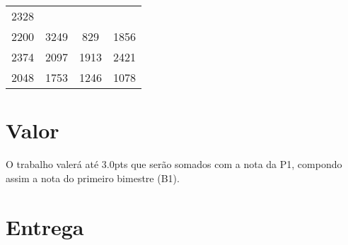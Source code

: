 \documentclass[a4paper]{article}
\begin{document}
\begin{longtable}[c]{@{}cccc@{}}
\begin{minipage}[t]{0.06\columnwidth}
2328
\strut\end{minipage}\tabularnewline
\begin{minipage}[t]{0.06\columnwidth}\centering\strut
2200
\strut\end{minipage} &
\begin{minipage}[t]{0.06\columnwidth}\centering\strut
3249
\strut\end{minipage} &
\begin{minipage}[t]{0.06\columnwidth}\centering\strut
829
\strut\end{minipage} &
\begin{minipage}[t]{0.06\columnwidth}\centering\strut
1856
\strut\end{minipage}\tabularnewline
\begin{minipage}[t]{0.06\columnwidth}\centering\strut
2374
\strut\end{minipage} &
\begin{minipage}[t]{0.06\columnwidth}\centering\strut
2097
\strut\end{minipage} &
\begin{minipage}[t]{0.06\columnwidth}\centering\strut
1913
\strut\end{minipage} &
\begin{minipage}[t]{0.06\columnwidth}\centering\strut
2421
\strut\end{minipage}\tabularnewline
\begin{minipage}[t]{0.06\columnwidth}\centering\strut
2048
\strut\end{minipage} &
\begin{minipage}[t]{0.06\columnwidth}\centering\strut
1753
\strut\end{minipage} &
\begin{minipage}[t]{0.06\columnwidth}\centering\strut
1246
\strut\end{minipage} &
\begin{minipage}[t]{0.06\columnwidth}\centering\strut
1078
\strut\end{minipage}\tabularnewline
\bottomrule
\end{longtable}

\section{Valor}
O trabalho valerá até $3.0$pts que serão somados com a nota da P1, compondo assim a nota do primeiro bimestre (B1).

\section{Entrega}
\end{document}
